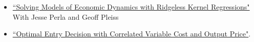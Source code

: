 \documentclass[10pt]{article}
\newenvironment{innerlist}[1][\enskip\textbullet]%
        {\begin{itemize}[#1,leftmargin=*,parsep=0pt,itemsep=0pt,topsep=0pt,partopsep=0pt]}
        {\end{itemize}}
\newcommand{\halfblankline}{\quad\vspace{-0.5\baselineskip}\pagebreak[3]}
\begin{document}
\begin{innerlist}
\halfblankline 
\item 	\href{https://arxiv.org/abs/2406.01898}{``Solving Models of Economic Dynamics with Ridgeless Kernel Regressions"}\\
{\small With Jesse Perla and Geoff Pleiss}
\vspace{2mm} 
\item \href{https://mekahou.github.io/docs/Papers/input_output.pdf}{``Optimal Entry Decision with Correlated Variable Cost and Output Price"}. \\
\end{innerlist}
\end{document}
